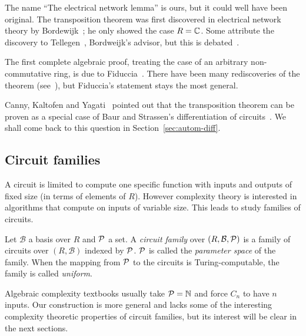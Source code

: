\begin{nota}
  The name ``The electrical network lemma'' is ours, but it could well
  have been original. The transposition theorem was first discovered
  in electrical network theory by Bordewijk~\cite{bordewijk57}; he
  only showed the case $R=\mathbb{C}$. Some attribute the discovery to
  Tellegen~\cite{burgisser+clausen-shokrollahi,bostan+lecerf+schost:tellegen},
  Bordweijk's advisor, but this is debated~\cite{djb:tellegen}.

  The first complete algebraic proof, treating the case of an
  arbitrary non-commutative ring, is due to
  Fiduccia~\cite{fiduccia:phd}. There have been many rediscoveries of
  the theorem (see~\cite{djb:tellegen}), but Fiduccia's statement stays
  the most general.

  Canny, Kaltofen and Yagati~\cite{canny+kaltofen+yagati89,Ka2K}
  pointed out that the transposition theorem can be proven as a
  special case of Baur and Strassen's differentiation of
  circuits~\cite{baur+strassen83}. We shall come back to this question
  in Section~\ref{sec:autom-diff}.
\end{nota}


\subsection{Circuit families}
\label{sec:uniformity}

A circuit is limited to compute one specific function with inputs and
outputs of fixed size (in terms of elements of $R$). However complexity
theory is interested in algorithms that compute on inputs of variable
size. This leads to study families of circuits.

\begin{definition}
  Let $\mathcal{B}$ a basis over $R$ and $\mathcal{P}$ a set. A
  \emph{circuit family} over
  $(R,\mathcal{B},\mathcal{P})$ is a family of circuits over
  $(R,\mathcal{B})$ indexed by $\mathcal{P}$.  $\mathcal{P}$ is called the
  \emph{parameter space} of the family. When
  the mapping from $\mathcal{P}$ to the circuits is Turing-computable, the
  family is called \emph{uniform}.
\end{definition}

Algebraic complexity textbooks usually take $\mathcal{P}=\mathbb{N}$ and force
$C_n$ to have $n$ inputs. Our construction is more general and lacks
some of the interesting complexity theoretic properties of circuit
families, but its interest will be clear in the next sections.

